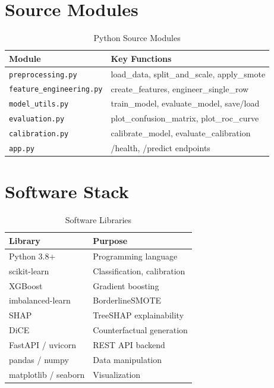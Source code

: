 \documentclass[journal]{IEEEtran}
\begin{document}
\section{Source Modules}

\begin{table}[!t]
\centering
\caption{Python Source Modules}
\label{tab:source_modules}
\begin{tabular}{lp{4cm}}
\toprule
\textbf{Module} & \textbf{Key Functions} \\
\midrule
\texttt{preprocessing.py} & load\_data, split\_and\_scale, apply\_smote \\
\texttt{feature\_engineering.py} & create\_features, engineer\_single\_row \\
\texttt{model\_utils.py} & train\_model, evaluate\_model, save/load \\
\texttt{evaluation.py} & plot\_confusion\_matrix, plot\_roc\_curve \\
\texttt{calibration.py} & calibrate\_model, evaluate\_calibration \\
\texttt{app.py} & /health, /predict endpoints \\
\bottomrule
\end{tabular}
\end{table}


\section{Software Stack}

\begin{table}[!t]
\centering
\caption{Software Libraries}
\label{tab:software}
\begin{tabular}{ll}
\toprule
\textbf{Library} & \textbf{Purpose} \\
\midrule
Python 3.8+ & Programming language \\
scikit-learn & Classification, calibration \\
XGBoost & Gradient boosting \\
imbalanced-learn & BorderlineSMOTE \\
SHAP & TreeSHAP explainability \\
DiCE & Counterfactual generation \\
FastAPI / uvicorn & REST API backend \\
pandas / numpy & Data manipulation \\
matplotlib / seaborn & Visualization \\
\bottomrule
\end{tabular}
\end{table}
\end{document}
